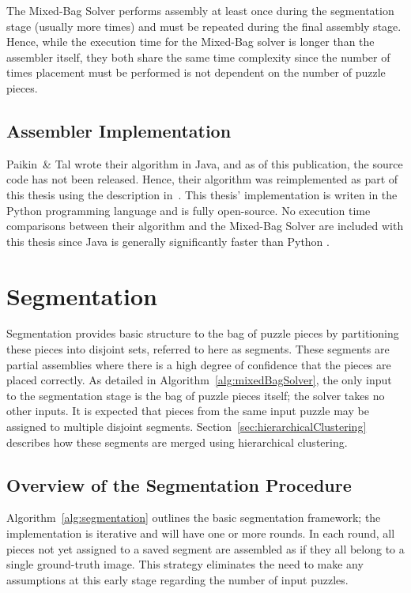 The Mixed-Bag Solver performs assembly at least once during the segmentation stage (usually more times) and must be repeated during the final assembly stage.  Hence, while the execution time for the Mixed-Bag solver is longer than the assembler itself, they both share the same time complexity since the number of times placement must be performed is not dependent on the number of puzzle pieces.

\subsection{Assembler Implementation}\label{sec:assemblerImplementation}

Paikin~\& Tal wrote their algorithm in Java, and as of this publication, the source code has not been released.  Hence, their algorithm was reimplemented as part of this thesis using the description in~\cite{paikin2015}.  This thesis' implementation is writen in the Python programming language and is fully open-source.  No execution time comparisons between their algorithm and the Mixed-Bag Solver are included with this thesis since Java is generally significantly faster than Python \cite{pythonJavaComparison}.

\section{Segmentation}\label{sec:Segmentation}

Segmentation provides basic structure to the bag of puzzle pieces by partitioning these pieces into disjoint sets, referred to here as segments.  These segments are partial assemblies where there is a high degree of confidence that the pieces are placed correctly. As detailed in Algorithm~\ref{alg:mixedBagSolver}, the only input to the segmentation stage is the bag of puzzle pieces itself; the solver takes no other inputs.  It is expected that pieces from the same input puzzle may be assigned to multiple disjoint segments.  Section~\ref{sec:hierarchicalClustering} describes how these segments are merged using hierarchical clustering.

\subsection{Overview of the Segmentation Procedure}

Algorithm~\ref{alg:segmentation} outlines the basic segmentation framework; the implementation is iterative and will have one or more rounds.  In each round, all pieces not yet assigned to a saved segment are assembled as if they all belong to a single ground-truth image.  This strategy eliminates the need to make any assumptions at this early stage regarding the number of input puzzles. 

